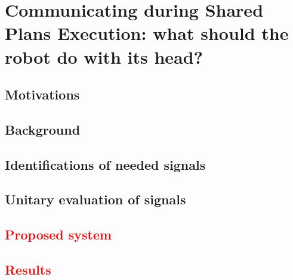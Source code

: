 \documentclass[english,a4paper,11pt,twoside]{StyleThese}
\begin{document}
\setcounter{chapter}{4} %
\dominitoc
\faketableofcontents
\fi

\chapter{Communicating during Shared Plans Execution: what should the robot do with its head?}
\minitoc

\label{ch:Acting}

\section{Motivations}

\section{Background}

\section{Identifications of needed signals}

\section{Unitary evaluation of signals}

\section{\textcolor{red}{Proposed system}}

\section{\textcolor{red}{Results}}

\ifdefined{}
\else


\end{document}
